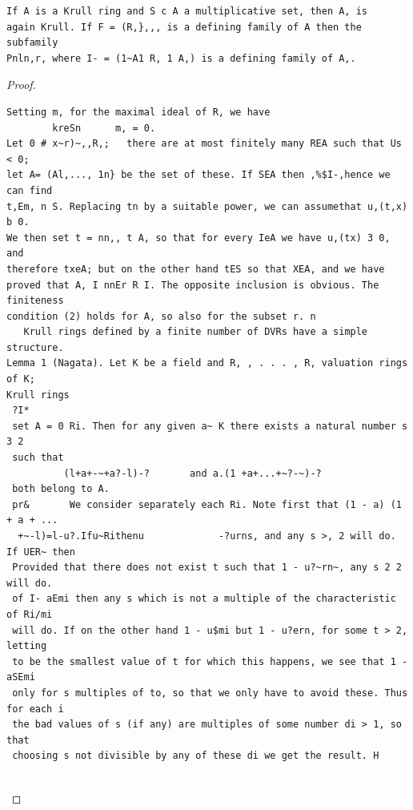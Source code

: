 \begin{theorem}\label{mcrt-auto-theorem-12-1}\uses{}
\begin{verbatim}
If A is a Krull ring and S c A a multiplicative set, then A, is
again Krull. If F = (R,},,, is a defining family of A then the subfamily
Pnln,r, where I- = (1~A1 R, 1 A,) is a defining family of A,.
\end{verbatim}
\end{theorem}
\begin{proof}
\begin{verbatim}
Setting m, for the maximal ideal of R, we have
        kreSn      m, = 0.
Let 0 # x~r)~,,R,;   there are at most finitely many REA such that Us < 0;
let A= (Al,..., 1n} be the set of these. If SEA then ,%$I-,hence we can find
t,Em, n S. Replacing tn by a suitable power, we can assumethat u,(t,x) b 0.
We then set t = nn,, t A, so that for every IeA we have u,(tx) 3 0, and
therefore txeA; but on the other hand tES so that XEA, and we have
proved that A, I nnEr R I. The opposite inclusion is obvious. The finiteness
condition (2) holds for A, so also for the subset r. n
   Krull rings defined by a finite number of DVRs have a simple structure.
Lemma 1 (Nagata). Let K be a field and R, , . . . , R, valuation rings of K;
Krull rings
 ?I*
 set A = 0 Ri. Then for any given a~ K there exists a natural number s 3 2
 such that
          (l+a+-~+a?-l)-?       and a.(1 +a+...+~?-~)-?
 both belong to A.
 pr&       We consider separately each Ri. Note first that (1 - a) (1 + a + ...
  +~-l)=l-u?.Ifu~Rithenu             -?urns, and any s >, 2 will do. If UER~ then
 Provided that there does not exist t such that 1 - u?~rn~, any s 2 2 will do.
 of I- aEmi then any s which is not a multiple of the characteristic of Ri/mi
 will do. If on the other hand 1 - u$mi but 1 - u?ern, for some t > 2, letting
 to be the smallest value of t for which this happens, we see that 1 - aSEmi
 only for s multiples of to, so that we only have to avoid these. Thus for each i
 the bad values of s (if any) are multiples of some number di > 1, so that
 choosing s not divisible by any of these di we get the result. H


\end{verbatim}
\end{proof}
